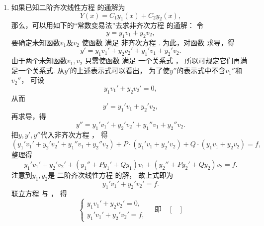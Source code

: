 \begin{enumerate}
	\item%
	如果已知二阶齐次线性方程  的通解为\[
		Y(x) = C_1 y_1(x) + C_2 y_2(x),
	\]
	那么，可以用如下的“常数变易法”去求非齐次方程  的通解：
	令\begin{equation}\label{equation:微分方程.二阶非齐次线性微分方程的通解设想}
		y = y_1 v_1 + y_2 v_2,
	\end{equation}
	要确定未知函数\(v_1\)及\(v_2\)
	使函数  满足
	非齐次方程 .
	为此，对函数  求导，得\[
		y' = y_1 v_1' + y_2 v_2' + y_1' v_1 + y_2' v_2.
	\]
	由于两个未知函数\(v_1,v_2\)
	只需使函数  满足
	一个关系式 ，
	所以可规定它们再满足一个关系式.
	从\(y'\)的上述表示式可以看出，
	为了使\(y''\)的表示式中不含\(v_1''\)和\(v_2''\)，
	可设\begin{equation}\label{equation:微分方程.二阶非齐次线性微分方程的额外条件1}
		y_1 v_1' + y_2 v_2' = 0,
	\end{equation}
	从而\[
		y' = y_1' v_1 + y_2' v_2,
	\]
	再求导，得\[
		y'' = y_1' v_1' + y_2' v_2' + y_1'' v_1 + y_2'' v_2.
	\]
	把\(y,y',y''\)代入非齐次方程 ，
	得\[
		(y_1' v_1' + y_2' v_2' + y_1'' v_1 + y_2'' v_2)
		+P\cdot(y_1' v_1 + y_2' v_2) + Q\cdot(y_1 v_1 + y_2 v_2) = f,
	\]
	整理得\[
		y_1' v_1' + y_2' v_2'
		+ (y_1'' + P y_1' + Q y_1) v_1
		+ (y_2'' + P y_2' + Q y_2) v_2
		= f.
	\]
	注意到\(y_1,y_2\)是
	二阶齐次线性方程  的解，
	故上式即为
	\begin{equation}\label{equation:微分方程.二阶非齐次线性微分方程的额外条件2}
		y_1' v_1' + y_2' v_2' = f.
	\end{equation}
	联立方程 
	与 ，
	得\[
		\left\{ \begin{array}{l}
			y_1 v_1' + y_2 v_2' = 0, \\
			y_1' v_1' + y_2' v_2' = f,
		\end{array} \right.
		\quad\text{即}\quad
		\begin{bmatrix}

\end{bmatrix}\]
\end{enumerate}
